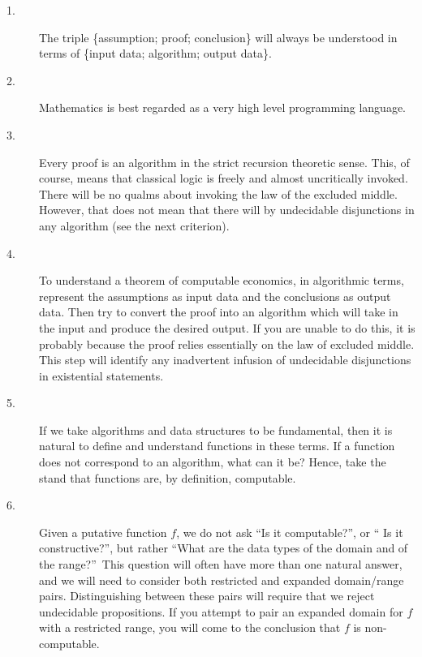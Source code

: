 \documentclass{ucthesis}
\begin{document}
\begin{description}
\item[1.] \qquad \qquad The triple \{assumption; proof; conclusion\} will
always be understood in terms of \{input data; algorithm; output data\}.

\item[2.] \qquad \qquad Mathematics is best regarded as a very high level
programming language.

\item[3.] \qquad \qquad Every proof is an algorithm in the strict recursion
theoretic sense. This, of course, means that classical logic is freely and
almost uncritically invoked. There will be no qualms about invoking the law
of the excluded middle. However, that does not mean that there will by
undecidable disjunctions in any algorithm (see the next criterion).

\item[4.] \qquad \qquad To understand a theorem of computable economics, in
algorithmic terms, represent the assumptions as input data and the
conclusions as output data. Then try to convert the proof into an algorithm
which will take in the input and produce the desired output. If you are
unable to do this, it is probably because the proof relies essentially on
the law of excluded middle. This step will identify any inadvertent infusion
of undecidable disjunctions in existential statements.

\item[5.] \qquad \qquad If we take algorithms and data structures to be
fundamental, then it is natural to define and understand functions in these
terms. If a function does not correspond to an algorithm, what can it be?
Hence, take the stand that functions are, by definition, computable.

\item[6.] \qquad \qquad Given a putative function $f$, we do not ask
\textquotedblleft Is it computable?\textquotedblright , or \textquotedblleft
Is it constructive?\textquotedblright , but rather \textquotedblleft What
are the data types of the domain and of the range?\textquotedblright\ This
question will often have more than one natural answer, and we will need to
consider both restricted and expanded domain/range pairs. Distinguishing
between these pairs will require that we reject undecidable propositions. If
you attempt to pair an expanded domain for $f$ with a restricted range, you
will come to the conclusion that $f$ is non-computable.
\end{description}
\end{document}

